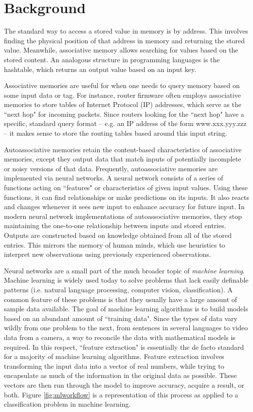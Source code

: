\documentclass{sig-alternate}
\begin{document}
\section{Background}
\label{sec:background}

The standard way to access a stored value in memory is by address. 
This involves finding the physical position of that address in memory
and returning the stored value. Meanwhile, associative memory allows
searching for values based on the stored content. An analogous structure
in programming languages is the hashtable, which returns an output value
based on an input key. 	

Associative memories are useful for when one needs to query memory based 
on some input data or tag. For instance, router firmware often employs associative 
memories to store tables of Internet Protocol (IP) addresses, which serve as the ``next hop" for incoming 
packets. Since routers looking for the ``next hop" have a specific, standard query 
format -- e.g. an IP address of the form www.xxx.yyy.zzz -- it makes sense to store the 
routing tables based around this input string.

Autoassociative memories retain the content-based characteristics of associative memories, except
they output data that match inputs of potentially incomplete or noisy versions of that data.
Frequently, autoassociative memories are implemented via neural networks. 
A neural network consists of a series of functions acting on ``features" or characteristics of given input values. 
Using these functions, it can find relationships or make predictions on its inputs. It also
reacts and changes whenever it sees new input to enhance accuracy for future input.
In modern neural network implementations of autoassociative memories, they stop maintaining the one-to-one relationship between inputs and 
stored entries. Outputs are constructed based on knowledge obtained from all of the stored entries.
This mirrors the memory of human minds, which use heuristics to interpret new observations using
previously experienced observations. 

Neural networks are a small part of the much broader topic of \textit{machine learning}. Machine learning
is widely used today to solve problems that lack easily definable patterns (i.e. natural language processing,
computer vision, classification). A common feature of these problems is that they usually have a large amount
of sample data available. The goal of machine learning algorithms is to build models based on an
abundant amount of ``training data". Since the types of data vary wildly from one problem to the next,
from sentences in several languages to video data from a camera, a way to reconcile the data with
mathematical models is required. In this respect, ``feature extraction" is essentially the de facto
standard for a majority of machine learning algorithms. Feature extraction involves transforming the
input data into a vector of real numbers, while trying to encapsulate as much of the information
in the original data as possible. These vectors are then run through the model to improve accuracy,
acquire a result, or both. Figure \ref{fig:mlworkflow} is a representation of this process as
applied to a classification problem in machine learning. 
\end{document}
